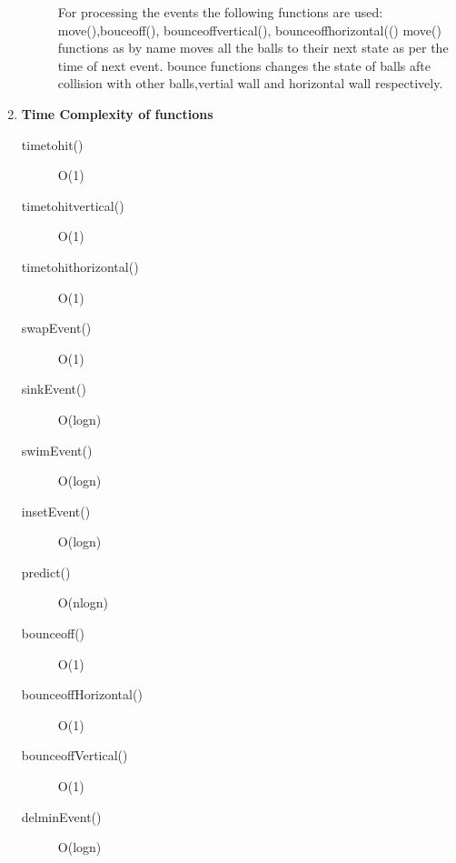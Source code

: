 \documentclass[a4paper,11pt]{article}
\begin{document}
\begin{enumerate}
\begin{description}
For processing the events the following functions are used:
move(),bouceoff(), bounceoffvertical(), bounceoffhorizontal(()
move() functions as by name moves all the balls to their next state as per the time of next event.
bounce functions changes the state of balls afte collision with other balls,vertial wall and horizontal wall respectively.
\end{description}
\clearpage 
 \item \textbf{Time Complexity of functions}
\begin{description}
  \item[timetohit()] O(1)
  \item[timetohitvertical()] O(1)
  \item[timetohithorizontal()] O(1)
  \item[swapEvent()] O(1)
  \item[sinkEvent()]O(logn)
  \item[swimEvent()]O(logn)
 \item[insetEvent()]O(logn)
  \item[predict()]O(nlogn)
  \item[bounceoff()]O(1)
\item[bounceoffHorizontal()]O(1)
\item[bounceoffVertical()]O(1)
 \item[delminEvent()]  O(logn)
\end{description}
\end{enumerate}
\addtolength{\oddsidemargin}{-.875in}
\end{document}
